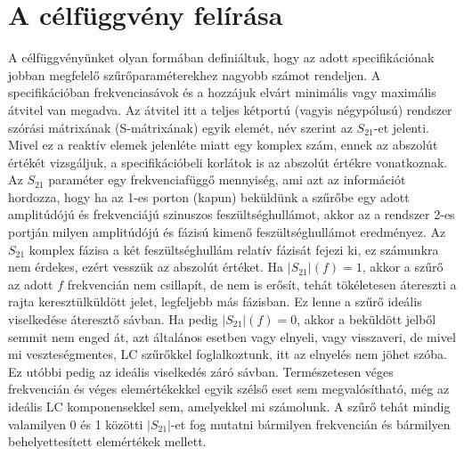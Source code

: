 \section{A célfüggvény felírása}
    A célfüggvényünket olyan formában definiáltuk, hogy az adott specifikációnak jobban megfelelő szűrőparaméterekhez nagyobb számot rendeljen. A specifikációban frekvenciasávok és a hozzájuk elvárt minimális vagy maximális átvitel van megadva. Az átvitel itt a teljes kétportú (vagyis négypólusú) rendszer szórási mátrixának (S-mátrixának) egyik elemét, név szerint az $S_{21}$-et jelenti. Mivel ez a reaktív elemek jelenléte miatt egy komplex szám, ennek az abszolút értékét vizsgáljuk, a specifikációbeli korlátok is az abszolút értékre vonatkoznak. Az $S_{21}$ paraméter egy frekvenciafüggő mennyiség, ami azt az információt hordozza, hogy ha az 1-es porton (kapun) beküldünk a szűrőbe egy adott amplitúdójú és frekvenciájú szinuszos feszültséghullámot, akkor az a rendszer 2-es portján milyen amplitúdójú és fázisú kimenő feszültséghullámot eredményez. Az $S_{21}$ komplex fázisa a két feszültséghullám relatív fázisát fejezi ki, ez számunkra nem érdekes, ezért vesszük az abszolút értéket. Ha $|S_{21}|(f) = 1$, akkor a szűrő az adott $f$ frekvencián nem csillapít, de nem is erősít, tehát tökéletesen átereszti a rajta keresztülküldött jelet, legfeljebb más fázisban. Ez lenne a szűrő ideális viselkedése áteresztő sávban. Ha pedig $|S_{21}|(f) = 0$, akkor a beküldött jelből semmit nem enged át, azt általános esetben vagy elnyeli, vagy visszaveri, de mivel mi veszteségmentes, LC szűrőkkel foglalkoztunk, itt az elnyelés nem jöhet szóba. Ez utóbbi pedig az ideális viselkedés záró sávban. Természetesen véges frekvencián és véges elemértékekkel egyik szélső eset sem megvalósítható, még az ideális LC komponensekkel sem, amelyekkel mi számolunk. A szűrő tehát mindig valamilyen 0 és 1 közötti $|S_{21}|$-et fog mutatni bármilyen frekvencián és bármilyen behelyettesített elemértékek mellett.

